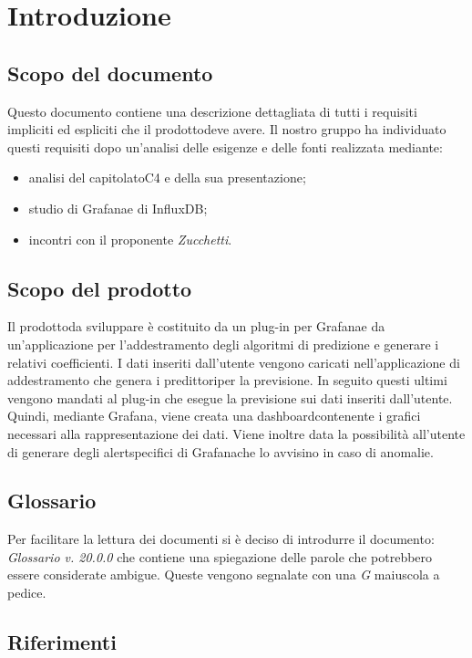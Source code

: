 \section{Introduzione}
	\subsection{Scopo del documento}
	Questo documento contiene una descrizione dettagliata di tutti i requisiti impliciti ed espliciti che il prodotto\glosp deve avere. Il nostro gruppo ha individuato questi requisiti dopo un'analisi delle esigenze e delle fonti realizzata mediante: 
	\begin{itemize}
		\item analisi del capitolato\glosp C4 e della sua presentazione; 
		\item studio di Grafana\glosp e di InfluxDB;
		\item incontri con il proponente \textit{Zucchetti}.
	\end{itemize}
	\subsection{Scopo del prodotto}
	Il prodotto\glosp da sviluppare è costituito da un plug-in per Grafana\glosp e da un'applicazione per l'addestramento degli algoritmi di predizione e generare i relativi coefficienti. I dati inseriti dall'utente vengono caricati nell'applicazione di addestramento che genera i predittori\glosp per la previsione. In seguito questi ultimi vengono mandati al plug-in che esegue la previsione sui dati inseriti dall'utente. Quindi, mediante Grafana\glo, viene creata una dashboard\glosp contenente i grafici necessari alla rappresentazione dei dati. Viene inoltre data la possibilità all'utente di generare degli alert\glosp specifici di Grafana\glosp che lo avvisino in caso di anomalie.
		
	\subsection{Glossario}
	Per facilitare la lettura dei documenti si è deciso di introdurre il documento: \textit{Glossario v. 20.0.0} che contiene una spiegazione delle parole che potrebbero essere considerate ambigue. Queste vengono segnalate con una \textit{G} maiuscola a pedice.  
	\subsection{Riferimenti}
